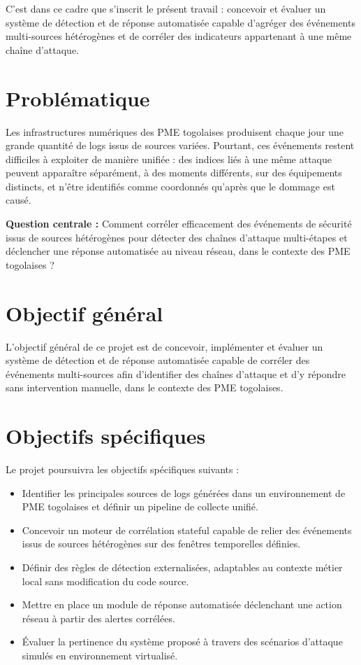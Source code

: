\documentclass[a4paper,12pt]{article}
\begin{document}
C'est dans ce cadre que s'inscrit le présent travail : concevoir et évaluer
un système de détection et de réponse automatisée capable d'agréger des
événements multi-sources hétérogènes et de corréler des indicateurs
appartenant à une même chaîne d'attaque.

\section{Problématique}

Les infrastructures numériques des PME togolaises produisent chaque jour
une grande quantité de logs issus de sources variées. Pourtant, ces
événements restent difficiles à exploiter de manière unifiée : des indices
liés à une même attaque peuvent apparaître séparément, à des moments
différents, sur des équipements distincts, et n'être identifiés comme
coordonnés qu'après que le dommage est causé.

\textbf{Question centrale :} Comment corréler efficacement des événements
de sécurité issus de sources hétérogènes pour détecter des chaînes
d'attaque multi-étapes et déclencher une réponse automatisée au niveau
réseau, dans le contexte des PME togolaises ?

\section{Objectif général}

L'objectif général de ce projet est de concevoir, implémenter et évaluer
un système de détection et de réponse automatisée capable de corréler des
événements multi-sources afin d'identifier des chaînes d'attaque et d'y
répondre sans intervention manuelle, dans le contexte des PME togolaises.

\section{Objectifs spécifiques}

Le projet poursuivra les objectifs spécifiques suivants :

\begin{itemize}
    \item Identifier les principales sources de logs générées dans un
    environnement de PME togolaises et définir un pipeline de collecte
    unifié.

    \item Concevoir un moteur de corrélation stateful capable de relier
    des événements issus de sources hétérogènes sur des fenêtres
    temporelles définies.

    \item Définir des règles de détection externalisées, adaptables au
    contexte métier local sans modification du code source.

    \item Mettre en place un module de réponse automatisée déclenchant
    une action réseau à partir des alertes corrélées.

    \item Évaluer la pertinence du système proposé à travers des scénarios
    d'attaque simulés en environnement virtualisé.
\end{itemize}
\end{document}
